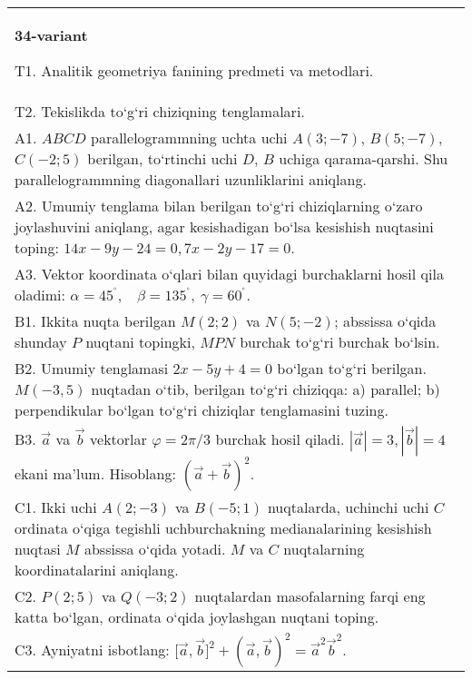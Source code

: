 \documentclass{article}
\begin{document}
\begin{tabular}{m{17cm}}
\textbf{34-variant}
\newline

T1. Analitik geometriya fanining predmeti va metodlari.
 \\
T2. 
Tekislikda to‘g‘ri chiziqning tenglamalari.
 \\
A1. 
$ABCD$ parallelogrammning uchta uchi $A (3; -7) $,
$B (5; -7) $, $C (-2; 5) $ berilgan, to‘rtinchi uchi $D$,
$B$ uchiga qarama-qarshi. Shu parallelogrammning diagonallari
uzunliklarini aniqlang.
 \\
A2. 
Umumiy tenglama bilan berilgan to‘g‘ri chiziqlarning
o‘zaro joylashuvini aniqlang, agar kesishadigan bo‘lsa kesishish nuqtasini
toping: $14x-9y-24=0, 7x-2y-17=0$.
 \\
A3. 
Vektor koordinata o‘qlari bilan quyidagi burchaklarni hosil qila oladimi:
$\alpha = 45^{{^\circ}},\ \ \ \ \beta = 135^{{^\circ}},\ \gamma = 60^{{^\circ}}$.
 \\
B1. 
Ikkita nuqta berilgan \(M (2;2) \) va \(N (5;-2) \); abssissa o‘qida shunday $P$ nuqtani topingki, $MPN$ burchak to‘g‘ri burchak bo‘lsin.
 \\
B2. 
Umumiy tenglamasi \(2x-5y+4=0\) bo‘lgan to‘g‘ri
berilgan. \(M (-3,5) \) nuqtadan o‘tib, berilgan to‘g‘ri chiziqqa: a) parallel;
b) perpendikular bo‘lgan to‘g‘ri chiziqlar tenglamasini tuzing.
 \\
B3. 
$\vec{a}$ va $\vec{b}$ vektorlar $\varphi = 2\pi/3$ burchak hosil qiladi. $|\vec{a}| = 3,|\vec{b}| = 4$ ekani ma’lum. Hisoblang:
$ (\vec{a} + \vec{b}) ^{2}$.
 \\
C1. 
Ikki uchi \(A (2; - 3) \) va \(B (-5;1) \) nuqtalarda,
uchinchi uchi $C$ ordinata o‘qiga tegishli uchburchakning
medianalarining kesishish nuqtasi $M$ abssissa o‘qida yotadi.
$M$ va $C$ nuqtalarning koordinatalarini aniqlang.
 \\
C2. 
\(P (2;5) \) va \(Q (- 3;2) \) nuqtalardan masofalarning
farqi eng katta bo‘lgan, ordinata o‘qida joylashgan nuqtani toping.
 \\
C3. 
Ayniyatni isbotlang: \(\lbrack\vec{a},\vec{b}\rbrack^{2} + (\vec{a},\vec{b}) ^{2} = {\vec{a}}^{2}{\vec{b}}^{2}\).
 \\

\end{tabular}
\vspace{1cm}
\end{document}
